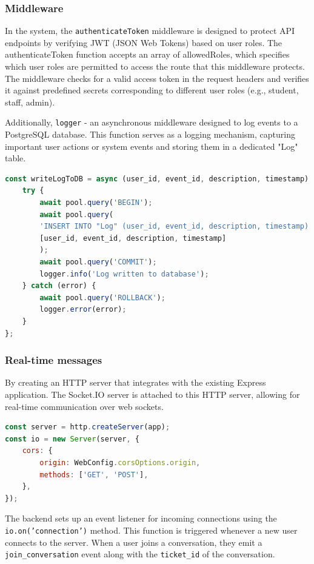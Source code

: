 \subsubsection{Middleware}
In the system, the \texttt{authenticateToken} middleware is designed to protect API endpoints by verifying JWT (JSON Web Tokens) based on user roles. The authenticateToken function accepts an array of allowedRoles, which specifies which user roles are permitted to access the route that this middleware protects. The middleware checks for a valid access token in the request headers and verifies it against predefined secrets corresponding to different user roles (e.g., student, staff, admin).

Additionally, \texttt{logger} - an asynchronous middleware designed to log events to a PostgreSQL database. This function serves as a logging mechanism, capturing important user actions or system events and storing them in a dedicated "Log" table. 
\begin{lstlisting}[language=Javascript, breaklines=true, caption= Logger middleware - write log to database]
const writeLogToDB = async (user_id, event_id, description, timestamp) => {
	try {
		await pool.query('BEGIN');
		await pool.query(
		'INSERT INTO "Log" (user_id, event_id, description, timestamp) VALUES ($1, $2, $3, $4)',
		[user_id, event_id, description, timestamp]
		);
		await pool.query('COMMIT');
		logger.info('Log written to database');
	} catch (error) {
		await pool.query('ROLLBACK');
		logger.error(error);
	}
};
\end{lstlisting}	

\subsubsection{Real-time messages}
By creating an HTTP server that integrates with the existing Express application. The Socket.IO server is attached to this HTTP server, allowing for real-time communication over web sockets.

\begin{lstlisting}[language=Javascript, breaklines=true, caption=Create Socket.io HTTP server]
const server = http.createServer(app);
const io = new Server(server, {
	cors: {
		origin: WebConfig.corsOptions.origin,
		methods: ['GET', 'POST'],
	},
});
\end{lstlisting}	



The backend sets up an event listener for incoming connections using the \texttt{io.on('connection')} method. This function is triggered whenever a new user connects to the server. When a user joins a conversation, they emit a \texttt{join\_conversation} event along with the \texttt{ticket\_id} of the conversation.

